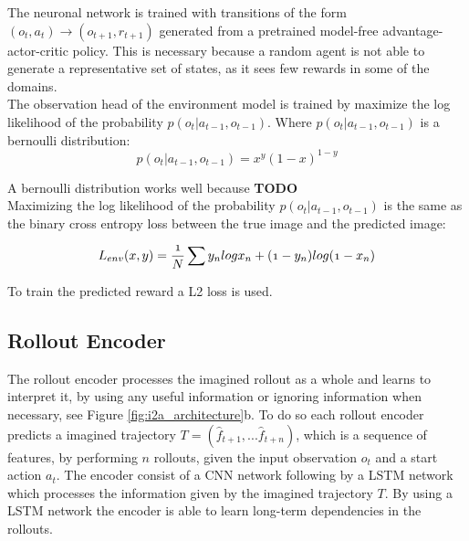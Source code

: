 The neuronal network is trained with transitions of the form $(o_t, a_t) \rightarrow (o_{t+1}, r_{t+1})$ generated from a pretrained model-free advantage-actor-critic policy. This is necessary because a random agent is not able to generate a representative set of states, as it sees few rewards in some of the domains.\\

 
The observation head of the environment model is trained by maximize the log likelihood of the probability $p(o_t | a_{t-1}, o_{t-1})$.
Where $p(o_t | a_{t-1}, o_{t-1})$ is a bernoulli distribution: 
\begin{equation} 
   p(o_t | a_{t-1}, o_{t-1}) = x^y (1-x)^{1-y} 
\end{equation}

A bernoulli distribution works well because \textbf{TODO}\\

   
Maximizing the log likelihood of the probability $p(o_t | a_{t-1}, o_{t-1})$ is the same as the binary cross entropy loss between the true image and the predicted image:

   
\begin{equation} 
  \mathnormal{ 
  L_{env}(x, y) = \frac{1}{N} \sum y_n log x_n + (1-y_n) log(1- x_n) 
  } 
\end{equation}

To train the predicted reward a L2 loss is used.\\
 
\subsection{Rollout Encoder}
 

The rollout encoder processes the imagined rollout as a whole and learns to interpret it, by using any useful information or ignoring information when necessary, see Figure \ref{fig:i2a_architecture}b.
To do so each rollout encoder predicts a imagined trajectory $T = (\hat{f}_{t+1}, ... \hat{f}_{t+n})$, which is a sequence of features, by performing $n$ rollouts, given the input observation $o_t$ and a start action $a_t$.
The encoder consist of a CNN network following by a LSTM network which processes the information given by the imagined trajectory $T$. By using a LSTM network the encoder is able to learn long-term dependencies in the rollouts.\\


